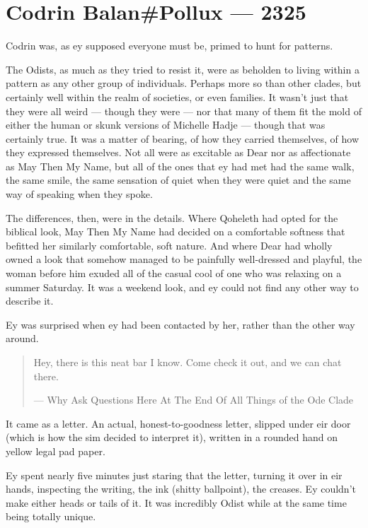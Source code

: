 \hypertarget{codrin-balanpollux-2325}{%
\chapter{Codrin Balan\#Pollux — 2325}\label{codrin-balanpollux-2325}}

Codrin was, as ey supposed everyone must be, primed to hunt for patterns.

The Odists, as much as they tried to resist it, were as beholden to living within a pattern as any other group of individuals. Perhaps more so than other clades, but certainly well within the realm of societies, or even families. It wasn't just that they were all weird — though they were — nor that many of them fit the mold of either the human or skunk versions of Michelle Hadje — though that was certainly true. It was a matter of bearing, of how they carried themselves, of how they expressed themselves. Not all were as excitable as Dear nor as affectionate as May Then My Name, but all of the ones that ey had met had the same walk, the same smile, the same sensation of quiet when they were quiet and the same way of speaking when they spoke.

The differences, then, were in the details. Where Qoheleth had opted for the biblical look, May Then My Name had decided on a comfortable softness that befitted her similarly comfortable, soft nature. And where Dear had wholly owned a look that somehow managed to be painfully well-dressed and playful, the woman before him exuded all of the casual cool of one who was relaxing on a summer Saturday. It was a weekend look, and ey could not find any other way to describe it.

Ey was surprised when ey had been contacted by her, rather than the other way around.

\begin{quote}
Hey, there is this neat bar I know. Come check it out, and we can chat there.

— Why Ask Questions Here At The End Of All Things of the Ode Clade
\end{quote}

It came as a letter. An actual, honest-to-goodness letter, slipped under eir door (which is how the sim decided to interpret it), written in a rounded hand on yellow legal pad paper.

Ey spent nearly five minutes just staring that the letter, turning it over in eir hands, inspecting the writing, the ink (shitty ballpoint), the creases. Ey couldn't make either heads or tails of it. It was incredibly Odist while at the same time being totally unique.

